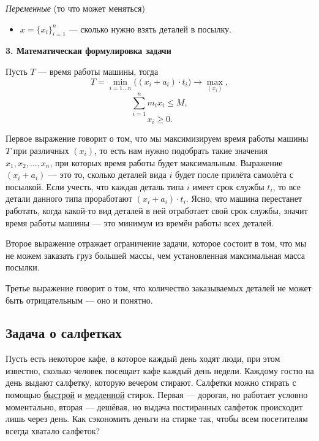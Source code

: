\textit{Переменные} (то что может меняться)

\begin{itemize}[nosep]	
	\item $x = \{x_i\}_{i=1}^n$ --- сколько нужно взять деталей в посылку.
\end{itemize}

\bigskip

\textbf{3. Математическая формулировка задачи}

Пусть $T$ --- время работы машины, тогда
\[T = \min_{i = 1 \dots n} \big((x_i + a_i) \cdot t_i\big) \to \max_{(x_i)},\]
\[\sum_{i=1}^{n} m_i x_i \le M,\]
\[x_i \ge 0.\]

Первое выражение говорит о том, что мы максимизируем время работы машины $T$ при различных $(x_i)$, то есть нам нужно подобрать такие значения $x_1, x_2, \dots, x_n$, при которых время работы будет максимальным. Выражение $(x_i + a_i)$ --- это то, сколько деталей вида $i$ будет после прилёта самолёта с посылкой. Если учесть, что каждая деталь типа $i$ имеет срок службы $t_i$, то все детали данного типа проработают $(x_i + a_i) \cdot t_i$. Ясно, что машина перестанет работать, когда какой-то вид деталей в ней отработает свой срок службы, значит время работы машины --- это минимум из времён работы всех деталей.

Второе выражение отражает ограничение задачи, которое состоит в том, что мы не можем заказать груз большей массы, чем установленная максимальная масса посылки.

Третье выражение говорит о том, что количество заказываемых деталей не может быть отрицательным --- оно и понятно.

\subsection{Задача о салфетках}

\problem[о салфетках]\label{pr:napkins}

Пусть есть некоторое кафе, в которое каждый день ходят люди, при этом известно, сколько человек посещает кафе каждый день недели. Каждому гостю на день выдают салфетку, которую вечером стирают. Салфетки можно стирать с помощью \underline{быстрой} и \underline{медленной} стирок. Первая --- дорогая, но работает условно моментально, вторая --- дешёвая, но выдача постиранных салфеток происходит лишь через день. Как сэкономить деньги на стирке так, чтобы всем посетителям всегда хватало салфеток?

\mathmodel

